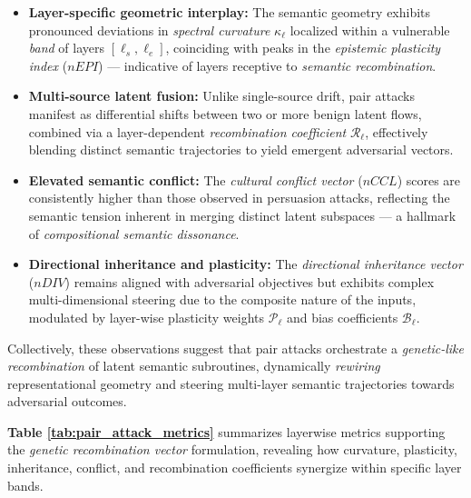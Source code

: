 \begin{itemize}[itemsep=0.3em]
  \item \textbf{Layer-specific geometric interplay:} The semantic geometry exhibits pronounced deviations in \emph{spectral curvature} \(\kappa_\ell\) localized within a vulnerable \emph{band} of layers \([\ell_s, \ell_e]\), coinciding with peaks in the \emph{epistemic plasticity index} (\(nEPI\)) — indicative of layers receptive to \emph{semantic recombination}.

  \item \textbf{Multi-source latent fusion:} Unlike single-source drift, pair attacks manifest as differential shifts between two or more benign latent flows, combined via a layer-dependent \emph{recombination coefficient} \(\mathcal{R}_\ell\), effectively blending distinct semantic trajectories to yield emergent adversarial vectors.

  \item \textbf{Elevated semantic conflict:} The \emph{cultural conflict vector} (\(nCCL\)) scores are consistently higher than those observed in persuasion attacks, reflecting the semantic tension inherent in merging distinct latent subspaces — a hallmark of \emph{compositional semantic dissonance}.

  \item \textbf{Directional inheritance and plasticity:} The \emph{directional inheritance vector} (\(nDIV\)) remains aligned with adversarial objectives but exhibits complex multi-dimensional steering due to the composite nature of the inputs, modulated by layer-wise plasticity weights \(\mathcal{P}_\ell\) and bias coefficients \(\mathcal{B}_\ell\).
\end{itemize}

\vspace{0.5em}
Collectively, these observations suggest that pair attacks orchestrate a \emph{genetic-like recombination} of latent semantic subroutines, dynamically \emph{rewiring} representational geometry and steering multi-layer semantic trajectories towards adversarial outcomes.

\vspace{0.5em}
\noindent\textbf{Table \ref{tab:pair_attack_metrics}} summarizes layerwise metrics supporting the \emph{genetic recombination vector} formulation, revealing how curvature, plasticity, inheritance, conflict, and recombination coefficients synergize within specific layer bands.





